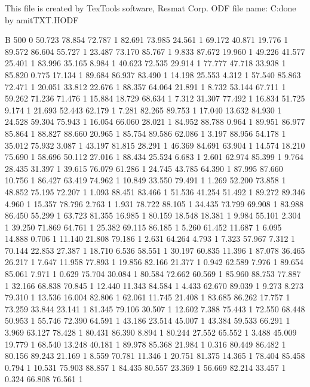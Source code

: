 This file is created by TexTools software, Resmat Corp.
ODF file name: C:\Users\Intel\Desktop\Texture done by amit\Sol TXT\solodf.HODF

B 500 0
	50.723	78.854	72.787	1
	82.691	73.985	24.561	1
	69.172	40.871	19.776	1
	89.572	86.604	55.727	1
	23.487	73.170	85.767	1
	9.833	87.672	19.960	1
	49.226	41.577	25.401	1
	83.996	35.165	8.984	1
	40.623	72.535	29.914	1
	77.777	47.718	33.938	1
	85.820	0.775	17.134	1
	89.684	86.937	83.490	1
	14.198	25.553	4.312	1
	57.540	85.863	72.471	1
	20.051	33.812	22.676	1
	88.357	64.064	21.891	1
	8.732	53.144	67.711	1
	59.262	71.236	71.476	1
	15.884	18.729	68.634	1
	7.312	31.307	77.492	1
	16.834	51.725	9.174	1
	21.693	52.443	62.179	1
	7.281	82.265	89.753	1
	17.040	13.632	84.930	1
	24.528	59.304	75.943	1
	16.054	66.060	28.021	1
	84.952	88.788	0.964	1
	89.951	86.977	85.864	1
	88.827	88.660	20.965	1
	85.754	89.586	62.086	1
	3.197	88.956	54.178	1
	35.012	75.932	3.087	1
	43.197	81.815	28.291	1
	46.369	84.691	63.904	1
	14.574	18.210	75.690	1
	58.696	50.112	27.016	1
	88.434	25.524	6.683	1
	2.601	62.974	85.399	1
	9.764	28.435	31.397	1
	39.615	76.079	61.286	1
	24.745	43.785	64.390	1
	87.995	87.660	10.756	1
	86.427	63.419	74.962	1
	10.849	33.550	79.491	1
	1.269	52.200	73.858	1
	48.852	75.195	72.207	1
	1.093	88.451	83.466	1
	51.536	41.254	51.492	1
	89.272	89.346	4.960	1
	15.357	78.796	2.763	1
	1.931	78.722	88.105	1
	34.435	73.799	69.908	1
	83.988	86.450	55.299	1
	63.723	81.355	16.985	1
	80.159	18.548	18.381	1
	9.984	55.101	2.304	1
	39.250	71.869	64.761	1
	25.382	69.115	86.185	1
	5.260	61.452	11.687	1
	6.095	14.888	0.706	1
	11.140	21.808	79.186	1
	2.631	64.264	4.793	1
	7.323	57.967	7.312	1
	70.144	22.853	27.387	1
	18.710	6.536	58.551	1
	30.197	60.835	11.396	1
	87.078	36.465	26.217	1
	7.647	11.958	77.893	1
	19.856	82.166	21.377	1
	0.942	62.589	7.976	1
	89.654	85.061	7.971	1
	0.629	75.704	30.084	1
	80.584	72.662	60.569	1
	85.960	88.753	77.887	1
	32.166	68.838	70.845	1
	12.440	11.343	84.584	1
	4.433	62.670	89.039	1
	9.273	8.273	79.310	1
	13.536	16.004	82.806	1
	62.061	11.745	21.408	1
	83.685	86.262	17.757	1
	73.259	33.844	23.141	1
	81.345	79.106	30.507	1
	12.602	7.388	75.443	1
	72.550	68.448	50.953	1
	55.746	72.390	64.591	1
	43.186	23.514	45.007	1
	43.384	59.533	66.291	1
	3.969	63.127	78.428	1
	80.431	86.390	8.894	1
	80.244	27.552	65.552	1
	3.488	45.009	19.779	1
	68.540	13.248	40.181	1
	89.978	85.368	21.984	1
	0.316	80.449	86.482	1
	80.156	89.243	21.169	1
	8.559	70.781	11.346	1
	20.751	81.375	14.365	1
	78.404	85.458	0.794	1
	10.531	75.903	88.857	1
	84.435	80.557	23.369	1
	56.669	82.214	33.457	1
	0.324	66.808	76.561	1
